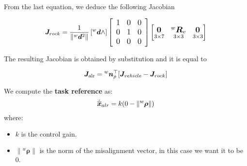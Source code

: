 \documentclass{article}
\begin{document}

From the last equation, we deduce the following Jacobian

\begin{equation}
\large
{\boldsymbol J_{rock}} =
\frac{1}{\left\|{^w} \boldsymbol d^{2}\right\|}\left[{^w}{\boldsymbol d} \wedge\right]\left[\begin{array}{lll}
1 & 0 & 0 \\
0 & 1 & 0 \\
0 & 0 & 0
\end{array}\right]
    \begin{bmatrix}
     \underset{3\times 7}{\boldsymbol{0}_{ }} & \underset{ 3\times 3}{^{w}\boldsymbol{R}_{v}} & \underset{3\times 3}{\boldsymbol{0}_{ }} \\
    \end{bmatrix}
\end{equation}

The resulting Jacobian is obtained by substitution and it is equal to 

\begin{equation}
\large
\boldsymbol J_{\text {alr}}={^w}{\boldsymbol n_{\rho}^\top}[{ \boldsymbol J_{vehicle} - \boldsymbol J_{rock}}]
\end{equation}

\noindent
\vspace{10px}

We compute the \textbf{task reference} as:
\begin{equation}
\large
    \dot{\overline{\boldsymbol{x}}}_{alr} = k( 0 - \left\| ^w \boldsymbol \rho \right\|) %
\end{equation}
where:
\begin{itemize}
    \item $k$ is the control gain.
    \item $\left\| ^w \boldsymbol \rho \right\|$ is the norm of the misalignment vector, in this case we want it to be $0$.
\end{itemize} 
\end{document}
